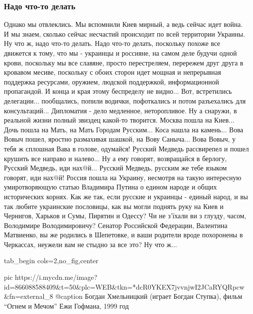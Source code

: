  
 
 
 
 

\subsubsection{Надо что-то делать}
\label{sec:moje.prizyv.nado_chto_to_delat}

Однако мы отвлеклись. Мы вспомнили Киев мирный, а ведь сейчас идет война. И мы
знаем, сколько сейчас несчастий происходит по всей территории Украины. Ну что
ж, надо что-то делать. Надо что-то делать, поскольку похоже все движется к
тому, что мы - украинцы и россияне, на самом деле будучи одной крови, поскольку
мы все славяне, просто перестреляем, перережем друг друга в кровавом месиве,
поскольку с обоих сторон идет мощная и непрерывная поддержка ресурсами,
оружием, людской поддержкой, информационной пропагандой. И конца и края этому
беспределу не видно... Вот, встретились делегации... пообщались, попили
водички, пофоткались и потом разъехались для консультаций... Дипломатия - дело
медленное, неторопливое. Ну а снаружи, в реальной жизни полный звиздец какой-то
творится. Москва пошла на Киев... Дочь пошла на Мать, на Мать Городам
Русским... Коса нашла на камень... Вова Вовыч пошел, яростно размахивая шашкой,
на Вову Саныча... Вова Вовыч, у тебя ж сплошная Вава в голове, одумайся! Русский Медведь рассвирепел и пошел крушить все направо и
налево... Ну а ему говорят, возвращайся в берлогу, Русский Медведь, иди
нах@й... Русский Медведь, русским же тебе языком говорят, иди нах@й! Россия
пошла на Украину, несмотря на такую интересную умиротворяющую статью Владимира
Путина о едином народе и общих исторических корнях. Как же так, если русские и
украинцы - единый народ, и вы так любите украинские пословицы, как вы могли
поднять руку на Киев и Чернигов, Харьков и Сумы, Пирятин и Одессу? Чи не
з'їхали ви з глузду, часом, Володимире Володимировичу? Сенатор Российской
Федерации, Валентина Матвиенко, вы же родились в Шепетовке, и ваши родители
вроде похоронены в Черкассах, неужели вам не стыдно за все это? Ну что ж... 

\ifcmt
  tab_begin cols=2,no_fig,center

		 pic https://i.mycdn.me/image?id=866088588409&t=50&plc=WEB&tkn=*dcR0YKEX7jvvnjwI2JCaRYQRpcw&fn=external_8
		 @caption Богдан Хмельницкий (играет Богдан Ступка), фильм \enquote{Огнем и Мечом} Ежи Гофмана, 1999 год

